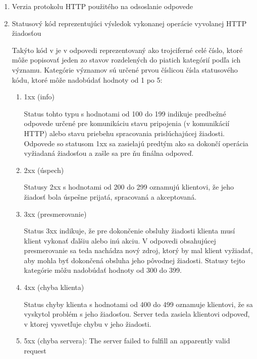 \begin{enumerate}
    \item Verzia protokolu HTTP použitého na odsoslanie odpovede

    \item Statusový kód reprezentujúci výsledok vykonanej operácie vyvolanej HTTP žiadosťou

    Takýto kód v je v odpovedi reprezentovaný ako trojciferné celé číslo, ktoré môže popisovať jeden
    zo stavov rozdelených do piatich kategórií podľa ich významu. 
    Kategórie významov sú určené prvou číslicou čísla statusového kódu, ktoré môže nadobúdať hodnoty od 1 po 5:

    \begin{enumerate}
        \item 1xx (info)
        
        Status tohto typu s hodnotami od 100 do 199 indikuje predbežné odpovede určené pre komunikáciu stavu pripojenia (v komunikácií HTTP) alebo stavu priebehu spracovania prislúchajúcej žiadosti.
        Odpovede so statusom 1xx sa zasielajú predtým ako sa dokončí operácia vyžiadaná žiadosťou a zašle sa pre ňu finálna odpoveď.
        
        \item 2xx (úspech)
        
        Statusy 2xx s hodnotami od 200 do 299 oznamujú klientovi, že jeho žiadosť bola úspešne prijatá, spracovaná a akceptovaná. 
        
        \item 3xx (presmerovanie)
        
        Status 3xx indikuje, že pre dokončenie obsluhy žiadosti klienta musí klient vykonať ďalšiu alebo inú akciu.
        V odpovedi obsahujúcej presmerovanie sa teda nachádza nový zdroj, ktorý by mal klient vyžiadať, aby mohla byť dokončená obsluha jeho pôvodnej žiadosti. 
        Statusy tejto kategórie môžu nadobúdať hodnoty od 300 do 399.
        
        \item 4xx (chyba klienta)

        Status chyby klienta s hodnotami od 400 do 499 oznamuje klientovi, že sa vyskytol problém s jeho žiadosťou.
        Server teda zasiela klientovi odpoveď, v ktorej vysvetľuje chybu v jeho žiadosti.
        
        \item 5xx (chyba servera): The server failed to fulfill an apparently valid request


\end{enumerate}
\end{enumerate}
